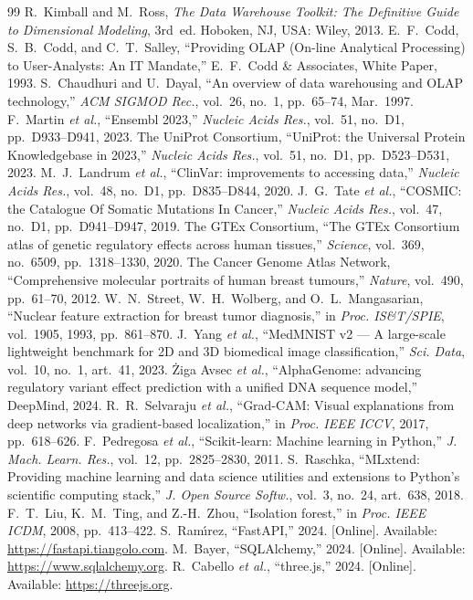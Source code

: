 \documentclass[conference,10pt]{IEEEtran}
\begin{document}
\begin{thebibliography}{99}
\footnotesize
{} R.~Kimball and M.~Ross, \textit{The Data Warehouse
Toolkit: The Definitive Guide to Dimensional Modeling}, 3rd~ed.
Hoboken, NJ, USA: Wiley, 2013.
 E.~F.~Codd, S.~B.~Codd, and C.~T.~Salley,
``Providing OLAP (On-line Analytical Processing) to User-Analysts:
An IT Mandate,'' E.~F.~Codd \& Associates, White Paper, 1993.
 S.~Chaudhuri and U.~Dayal, ``An overview of data
warehousing and OLAP technology,'' \textit{ACM SIGMOD Rec.}, vol.~26,
no.~1, pp.~65--74, Mar.~1997.
 F.~Martin \textit{et al.}, ``Ensembl 2023,''
\textit{Nucleic Acids Res.}, vol.~51, no.~D1, pp.~D933--D941, 2023.
 The UniProt Consortium, ``UniProt: the Universal
Protein Knowledgebase in 2023,'' \textit{Nucleic Acids Res.}, vol.~51,
no.~D1, pp.~D523--D531, 2023.
 M.~J.~Landrum \textit{et al.}, ``ClinVar:
improvements to accessing data,'' \textit{Nucleic Acids Res.}, vol.~48,
no.~D1, pp.~D835--D844, 2020.
 J.~G.~Tate \textit{et al.}, ``COSMIC: the Catalogue
Of Somatic Mutations In Cancer,'' \textit{Nucleic Acids Res.}, vol.~47,
no.~D1, pp.~D941--D947, 2019.
 The GTEx Consortium, ``The GTEx Consortium atlas of
genetic regulatory effects across human tissues,'' \textit{Science},
vol.~369, no.~6509, pp.~1318--1330, 2020.
 The Cancer Genome Atlas Network, ``Comprehensive
molecular portraits of human breast tumours,'' \textit{Nature},
vol.~490, pp.~61--70, 2012.
 W.~N.~Street, W.~H.~Wolberg, and O.~L.~Mangasarian,
``Nuclear feature extraction for breast tumor diagnosis,'' in
\textit{Proc. IS\&T/SPIE}, vol.~1905, 1993, pp.~861--870.
 J.~Yang \textit{et al.}, ``MedMNIST v2 --- A
large-scale lightweight benchmark for 2D and 3D biomedical image
classification,'' \textit{Sci. Data}, vol.~10, no.~1, art.~41, 2023.
 \.{Z}iga Avsec \textit{et al.}, ``AlphaGenome:
advancing regulatory variant effect prediction with a unified DNA
sequence model,'' DeepMind, 2024.
 R.~R.~Selvaraju \textit{et al.}, ``Grad-CAM:
Visual explanations from deep networks via gradient-based
localization,'' in \textit{Proc. IEEE ICCV}, 2017, pp.~618--626.
 F.~Pedregosa \textit{et al.}, ``Scikit-learn:
Machine learning in Python,'' \textit{J. Mach. Learn. Res.}, vol.~12,
pp.~2825--2830, 2011.
 S.~Raschka, ``MLxtend: Providing machine learning
and data science utilities and extensions to Python's scientific
computing stack,'' \textit{J. Open Source Softw.}, vol.~3, no.~24,
art.~638, 2018.
 F.~T.~Liu, K.~M.~Ting, and Z.-H.~Zhou, ``Isolation
forest,'' in \textit{Proc. IEEE ICDM}, 2008, pp.~413--422.
 S.~Ram\'{\i}rez, ``FastAPI,'' 2024. [Online].
Available: \url{https://fastapi.tiangolo.com}.
 M.~Bayer, ``SQLAlchemy,'' 2024. [Online].
Available: \url{https://www.sqlalchemy.org}.
 R.~Cabello \textit{et al.}, ``three.js,'' 2024.
[Online]. Available: \url{https://threejs.org}.
\end{thebibliography}
\end{document}
